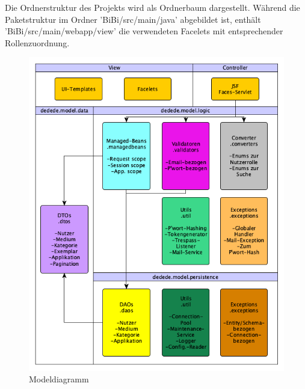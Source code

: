 \documentclass{article}
\begin{document}
Die Ordnerstruktur des Projekts wird als Ordnerbaum dargestellt.
Während die Paketstruktur im Ordner 'BiBi/src/main/java' abgebildet ist, enthält 'BiBi/src/main/webapp/view' die verwendeten Facelets mit entsprechender Rollenzuordnung. \vspace{0.5em}

\begin{figure}[H]
\centering
\includegraphics[width = 40em]{Modeldiagramm}
\caption{Modeldiagramm}
\end{figure}
	
\end{document}
